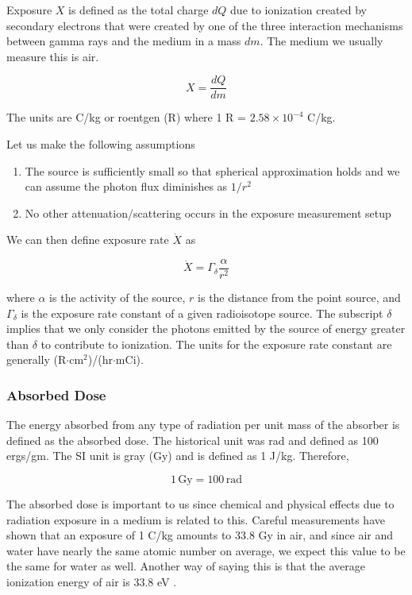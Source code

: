 \documentclass{article}
\begin{document}
Exposure $X$ is defined as the total charge $dQ$ due to ionization created by secondary electrons that were created by one of the three interaction mechanisms between gamma rays and the medium in a mass $dm$.
The medium we usually measure this is air.

\[X = \frac{dQ}{dm}\]

The units are C/kg or roentgen (R) where 1 R = $2.58 \times 10^{-4}$ C/kg.

Let us make the following assumptions

\begin{enumerate}
    \item The source is sufficiently small so that spherical approximation holds and we can assume the photon flux diminishes as $1/r^2$
    \item No other attenuation/scattering occurs in the exposure measurement setup
\end{enumerate}

We can then define exposure rate $\dot{X}$ as 

\begin{equation}\label{eqn:exposure_rate}
    \dot{X} = \Gamma_{\delta} \frac{\alpha}{r^2}
\end{equation}

where $\alpha$ is the activity of the source, $r$ is the distance from the point source, and $\Gamma_{\delta}$ is the exposure rate constant of a 
given radioisotope source. The subscript $\delta$ implies that we only consider the photons emitted by the source of energy greater than $\delta$ to contribute to ionization. 
The units for the exposure rate constant are generally (R$\cdot$cm$^2$)/(hr$\cdot$mCi).

\subsubsection{Absorbed Dose}

The energy absorbed from any type of radiation per unit mass of the absorber is defined as the absorbed dose. The historical unit was rad and defined as 100 ergs/gm.
The SI unit is gray (Gy) and is defined as 1 J/kg. Therefore,

\[1 \, \text{Gy} = 100 \, \text{rad}\]

The absorbed dose is important to us since chemical and physical effects due to radiation exposure in a medium is related to this. Careful measurements have shown that 
an exposure of 1 C/kg amounts to 33.8 Gy in air, and since air and water have nearly the same atomic number on average, we expect this value to be the same for water as well.
Another way of saying this is that the average ionization energy of air is 33.8 eV \cite{BNDHEPIrradiationApparatus}.
\end{document}
